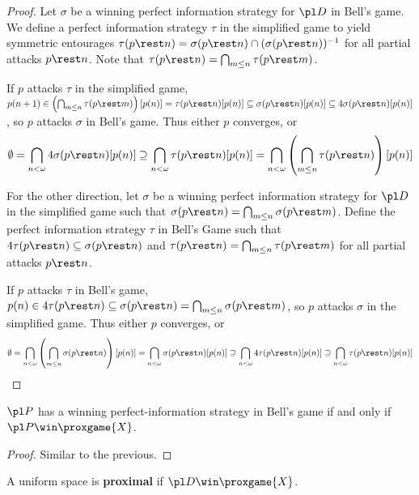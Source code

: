 \begin{proof}
  Let $\sigma$ be a winning perfect information strategy for $\pl D$ in Bell's game. We define a perfect information strategy $\tau$ in the simplified game to yield symmetric entourages $\tau(p\rest n)=\sigma(p\rest n)\cap(\sigma(p\rest n))^{-1}$ for all partial attacks $p\rest n$. Note that $\tau(p\rest n)=\bigcap_{m\leq n}\tau(p\rest m)$.

  If $p$ attacks $\tau$ in the simplified game, $p(n+1)\in\left(\bigcap_{m\leq n}\tau(p\rest m)\right)[p(n)]=\tau(p\rest n)[p(n)]\subseteq\sigma(p\rest n)[p(n)]\subseteq 4\sigma(p\rest n)[p(n)]$, so $p$ attacks $\sigma$ in Bell's game. Thus either $p$ converges, or 
    \[
      \emptyset
        =
      \bigcap_{n<\omega} 4\sigma(p\rest n)[p(n)]
        \supseteq 
      \bigcap_{n<\omega}\tau(p\rest n)[p(n)]
        =
      \bigcap_{n<\omega}\left(\bigcap_{m\leq n}\tau(p\rest n)\right)[p(n)]
    \]

  For the other direction, let $\sigma$ be a winning perfect information strategy for $\pl D$ in the simplified game such that $\sigma(p\rest n)=\bigcap_{m\leq n}\sigma(p\rest m)$. Define the perfect information strategy $\tau$ in Bell's Game such that $4\tau(p\rest n)\subseteq \sigma(p\rest n)$ and $\tau(p\rest n)=\bigcap_{m\leq n}\tau(p\rest m)$ for all partial attacks $p\rest n$.

  If $p$ attacks $\tau$ in Bell's game, $p(n)\in 4\tau(p\rest n)\subseteq\sigma(p\rest n)=\bigcap_{m\leq n}\sigma(p\rest m)$, so $p$ attacks $\sigma$ in the simplified game. Thus either $p$ converges, or
    \[
      \emptyset
        =
      \bigcap_{n<\omega}\left(\bigcap_{m\leq n}\sigma(p\rest n)\right)[p(n)]
        =
      \bigcap_{n<\omega}\sigma(p\rest n)[p(n)]
        \supseteq
      \bigcap_{n<\omega}4\tau(p\rest n)[p(n)]
        \supseteq
      \bigcap_{n<\omega}\tau(p\rest n)[p(n)]
    \]
\end{proof}

\begin{prop}
$\pl P$ has a winning perfect-information strategy in Bell's game if and only if $\pl P \win \proxgame{X}$.
\end{prop}

\begin{proof}
  Similar to the previous.
\end{proof}

\begin{defn}
  A uniform space is \textbf{proximal} if $\pl D \win \proxgame{X}$.
\end{defn}

